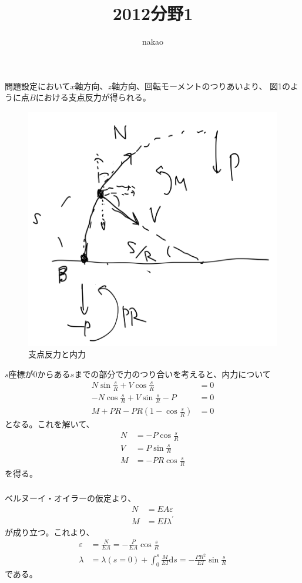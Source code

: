 \documentclass[a4paper]{jsarticle}
\begin{document}
\title{2012分野1}
\author{nakao}
\maketitle

\section{}
\subsection{}
\subsubsection{}
問題設定において$x$軸方向、$z$軸方向、回転モーメントのつりあいより、
図1のように点$B$における支点反力が得られる。
\begin{figure}[htb]
  \centering
  \includegraphics[width=0.3\hsize]{fig1.png}
  \caption{支点反力と内力}
\end{figure}
$s$座標が0からある$s$までの部分で力のつり合いを考えると、内力について
\begin{align}
  N \sin \frac{s}{R} + V \cos \frac{s}{R} &= 0 \\
  -N \cos \frac{s}{R} + V \sin \frac{s}{R} - P &= 0 \\
  M + P R - P R (1 - \cos \frac{s}{R}) &= 0
\end{align}
となる。これを解いて、
\begin{align}
  N &= -P \cos \frac{s}{R} \\
  V &= P \sin \frac{s}{R} \\
  M &= -P R \cos \frac{s}{R}
\end{align}
を得る。

\subsubsection{}
ベルヌーイ・オイラーの仮定より、
\begin{align}
  N &= E A \varepsilon \\
  M &= E I \lambda^{\prime}
\end{align}
が成り立つ。これより、
\begin{align}
  \varepsilon &= \frac{N}{E A} =
  -\frac{P}{E A} \cos \frac{s}{R} \\
  \lambda &= \lambda(s = 0)
  + \int_0^s \frac{M}{E I} \mathrm{d} s
  = -\frac{P R^2}{E I} \sin \frac{s}{R}
\end{align}
である。
\end{document}
